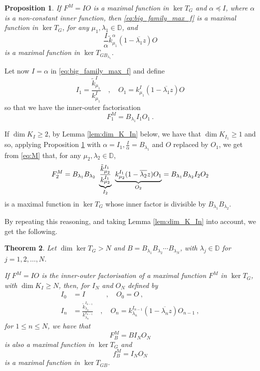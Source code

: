 \documentclass{article}
\numberwithin{equation}{section}
\theoremstyle{plain}
\newtheorem{thm}{Theorem}[section]
\newtheorem{prop}[thm]{Proposition}
\newcommand{\DD}{\ensuremath{\mathbb{D}}}
\newcommand{\ol}[1]{\ensuremath{\overline{#1}}}
\newcommand{\annot}[2]{\underbrace{#1}_{\smash[b]{\scriptstyle #2}}}
\begin{document}
\begin{prop}
\label{prop:max_func_subkernel_GB_1}
If $F^M = IO$ is a maximal function in $\ker T_G$ and $\alpha \preceq I$, where $\alpha$ is a non-constant inner function, then \eqref{eq:big_family_max_f} is a maximal function in $\ker T_G$, for any $\mu_1,\lambda_1\in\DD$, and
\begin{equation}
\frac{I}{\alpha} \tilde k^\alpha_{\mu_1} (1-\ol{\lambda_1} z) O
\end{equation}
is a maximal function in $\ker T_{G B_{\lambda_1}}$.
\end{prop}


Let now $I=\alpha$ in \eqref{eq:big_family_max_f} and define
\begin{equation}
I_1 = \frac{\tilde k^I_{\mu_1}}{k^I_{\mu_1}} \quad , \quad O_1 = k^I_{\mu_1} (1-\ol{\lambda_1} z) O
\end{equation}
so that we have the inner-outer factorisation
\begin{equation}
\label{eq:M}
F_1^M = B_{\lambda_1} I_1 O_1\ .
\end{equation}


If $\dim K_I \geq 2$, by Lemma \ref{lem:dim_K_In} below, we have that $\dim K_{I_1} \geq 1$ and so, applying Proposition \ref{prop:max_func_subkernel_GB_1} with $\alpha = I_1, \frac{I}{\alpha} = B_{\lambda_1}$ and $O$ replaced by $O_1$, we get from \eqref{eq:M} that, for any $\mu_2,\lambda_2\in\DD$,
\begin{equation}
F^M_2 = B_{\lambda_1} B_{\lambda_2} \ 
\annot{ \frac{\tilde k_{\mu_2}^{I_1}}{k_{\mu_2}^{I_1}} }{I_2} \ 
\annot{ k_{\mu_2}^{I_1} (1-\ol{\lambda_2} z) O_1 }{O_2}
= B_{\lambda_1} B_{\lambda_2} I_2 O_2
\end{equation}
is a maximal function in $\ker T_G$ whose inner factor is divisible by $B_{\lambda_1} B_{\lambda_2}$.


By repeating this reasoning, and taking Lemma \ref{lem:dim_K_In} into account, we get the following.


\begin{thm}
\label{thm:max_func_subkernel_gB}
Let $\dim \ker T_G > N$ and $B = B_{\lambda_1} B_{\lambda_2} \cdots B_{\lambda_N}$, with $\lambda_j\in\DD$ for $j=1,2,\dots, N$.

If $F^M = IO$ is the inner-outer factorisation of a maximal function $F^M$  in $\ker T_G$, with $\dim K_I \geq N$, then, for $I_N$ and $O_N$ defined by 
\begin{align}
I_0 	&= I \quad \qquad , \quad O_0 = O\ , \label{eq:def_In}\\
I_n &= \frac{\tilde k^{I_{n-1}}_{\lambda_n}}{k^{I_{n-1}}_{\lambda_n}}
\quad , \quad 
O_n = k^{I_{n-1}}_{\lambda_n} (1 - \ol{\lambda_n} z) O_{n-1}\ , \label{eq:def_On}
\end{align}
for $1\leq n \leq N$, we have that
\begin{equation}
\label{eq:max_func_vanishing_B}
F^M_B = B I_N O_N
\end{equation}
is also a maximal function in $\ker T_G$ and
\begin{equation}
f^M_B = I_N O_N
\end{equation}
is a maximal function in $\ker T_{G B}$.
\end{thm}
\end{document}
